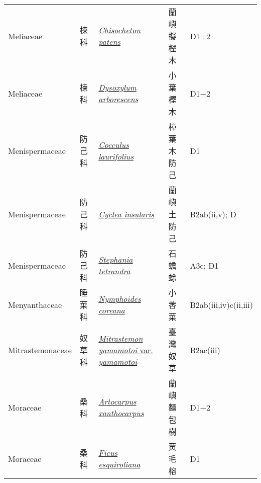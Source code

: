 {\begin{longtable}{L{2.5cm}L{2cm}L{5cm}L{2.5cm}L{3cm}}
    Meliaceae & 楝科 & \href{http://www.theplantlist.org/tpl1.1/search?q=Chisocheton+patens}{\textit{Chisocheton patens} } & 蘭嶼擬樫木 & D1+2    \\
    Meliaceae & 楝科 & \href{http://www.theplantlist.org/tpl1.1/search?q=Dysoxylum+arborescens}{\textit{Dysoxylum arborescens} } & 小葉樫木 & D1+2    \\
    Menispermaceae & 防己科 & \href{http://www.theplantlist.org/tpl1.1/search?q=Cocculus+laurifolius}{\textit{Cocculus laurifolius} } & 樟葉木防己 & D1    \\
    Menispermaceae & 防己科 & \href{http://www.theplantlist.org/tpl1.1/search?q=Cyclea+insularis}{\textit{Cyclea insularis} } & 蘭嶼土防己 & B2ab(ii,v); D    \\
    Menispermaceae & 防己科 & \href{http://www.theplantlist.org/tpl1.1/search?q=Stephania+tetrandra}{\textit{Stephania tetrandra} } & 石蟾蜍 & A3c; D1    \\
    Menyanthaceae & 睡菜科 & \href{http://www.theplantlist.org/tpl1.1/search?q=Nymphoides+coreana}{\textit{Nymphoides coreana} } & 小莕菜 & B2ab(iii,iv)c(ii,iii)    \\
    Mitrastemonaceae & 奴草科 & \href{http://www.theplantlist.org/tpl1.1/search?q=Mitrastemon+yamamotoi+var.+yamamotoi}{\textit{Mitrastemon yamamotoi} var. \textit{yamamotoi} } & 臺灣奴草 & B2ac(iii)    \\
    Moraceae & 桑科 & \href{http://www.theplantlist.org/tpl1.1/search?q=Artocarpus+xanthocarpus}{\textit{Artocarpus xanthocarpus} } & 蘭嶼麵包樹 & D1+2    \\
    Moraceae & 桑科 & \href{http://www.theplantlist.org/tpl1.1/search?q=Ficus+esquiroliana}{\textit{Ficus esquiroliana} } & 黃毛榕 & D1    \\

\end{longtable}}
